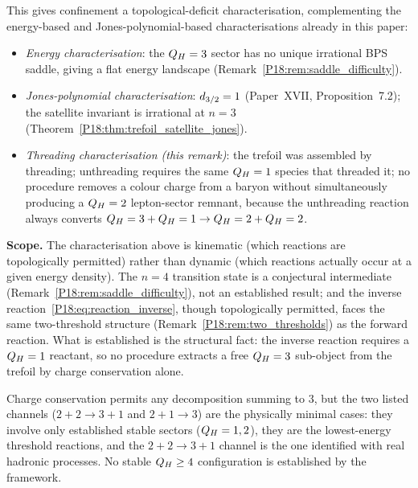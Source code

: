 \begin{remark}
This gives confinement a topological-deficit characterisation,
complementing the energy-based and Jones-polynomial-based
characterisations already in this paper:
\begin{itemize}[noitemsep]
\item \emph{Energy characterisation}: the $Q_H=3$ sector has no
  unique irrational BPS saddle, giving a flat energy landscape
  (Remark~\ref{P18:rem:saddle_difficulty}).
\item \emph{Jones-polynomial characterisation}: $d_{3/2}=1$
  (Paper~XVII, Proposition~7.2); the satellite invariant is
  irrational at $n=3$ (Theorem~\ref{P18:thm:trefoil_satellite_jones}).
\item \emph{Threading characterisation (this remark)}: the trefoil
  was assembled by threading; unthreading requires the same
  $Q_H=1$ species that threaded it; no procedure removes a
  colour charge from a baryon without simultaneously producing
  a $Q_H=2$ lepton-sector remnant, because the unthreading
  reaction always converts $Q_H=3+Q_H=1\to Q_H=2+Q_H=2$.
\end{itemize}

\textbf{Scope.}
The characterisation above is kinematic (which reactions are
topologically permitted) rather than dynamic (which reactions
actually occur at a given energy density).  The $n=4$ transition
state is a conjectural intermediate (Remark~\ref{P18:rem:saddle_difficulty}),
not an established result; and the inverse
reaction~\eqref{P18:eq:reaction_inverse}, though topologically
permitted, faces the same two-threshold structure
(Remark~\ref{P18:rem:two_thresholds}) as the forward reaction.
What is established is the structural fact: the inverse reaction
requires a $Q_H=1$ reactant, so no procedure extracts a free
$Q_H=3$ sub-object from the trefoil by charge conservation alone.
\end{remark}

\begin{remark}
\label{P18:rem:higher_charge_incoming}
Charge conservation permits any decomposition summing to $3$, but
the two listed channels ($2+2\to3+1$ and $2+1\to3$) are the
physically minimal cases: they involve only established stable
sectors ($Q_H=1,2$), they are the lowest-energy threshold
reactions, and the $2+2\to3+1$ channel is the one identified with
real hadronic processes. No stable $Q_H\geq4$ configuration is
established by the framework.
\end{remark}

